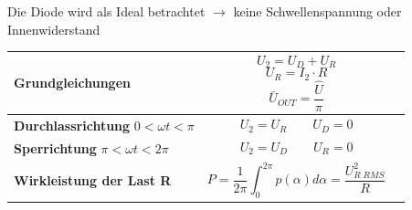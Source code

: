 Die Diode wird als Ideal betrachtet $ \rightarrow $ keine Schwellenspannung oder Innenwiderstand
\begin{longtable}{| p{} | p{} | p{} |} %
    \hline
    \textbf{Grundgleichungen}&
    \[ U_2 = U_D + U_R \]
    \[ U_R = I_2 \cdot R\]
    \[ \bar{U}_{OUT} = \dfrac{\hat{U}}{\pi}\]&\\
    \hline
    \textbf{Durchlassrichtung}\newline
    $ 0 < \omega t < \pi $&
    \vspace{-0.3cm}\[ U_2 = U_R \qquad U_D = 0 \] \vspace{-0.3cm}&\\
    \hline   
    \textbf{Sperrichtung}\newline
    $ \pi < \omega t < 2\pi $&
     \vspace{-0.3cm}\[ U_2=U_D \qquad U_R = 0 \] \vspace{-0.3cm}&\\
    \hline
    
    \textbf{Wirkleistung der Last R}&
    \[ P=\frac{1}{2\pi} \int_{0}^{2\pi} p(\alpha) d\alpha = \dfrac{U_{R\;RMS}^2}{R} \]&
    \\ \hline
%    
%        
%    
%        

\end{longtable}

